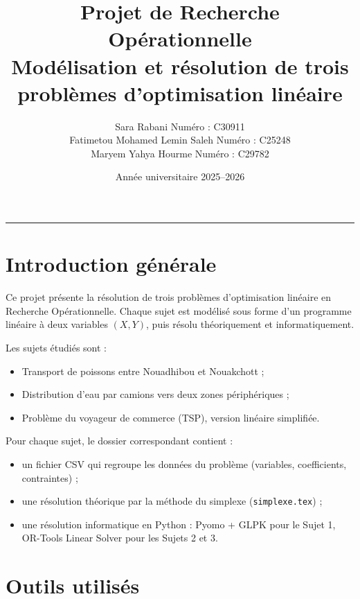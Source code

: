 \documentclass[12pt,a4paper]{article}
\title{\vspace{-1.2cm}\Huge\bfseries Projet de Recherche Opérationnelle\\[0.4em]
       \large\mdseries Modélisation et résolution de trois problèmes d'optimisation linéaire}
\author{%
  Sara Rabani \quad\textbar\quad Numéro : C30911 \\[2pt]
  Fatimetou Mohamed Lemin Saleh \quad\textbar\quad Numéro : C25248 \\[2pt]
  Maryem Yahya Hourme \quad\textbar\quad Numéro : C29782%
}
\date{Année universitaire 2025--2026}
\begin{document}

\maketitle
\thispagestyle{empty}
\vspace{0.5cm}
\hrule
\vspace{0.5cm}

\tableofcontents
\newpage

\section{Introduction générale}

Ce projet présente la résolution de trois problèmes d'optimisation linéaire en Recherche Opérationnelle. Chaque sujet est modélisé sous forme d'un programme linéaire à deux variables \((X, Y)\), puis résolu théoriquement et informatiquement.

Les sujets étudiés sont :
\begin{itemize}
    \item Transport de poissons entre Nouadhibou et Nouakchott ;
    \item Distribution d'eau par camions vers deux zones périphériques ;
    \item Problème du voyageur de commerce (TSP), version linéaire simplifiée.
\end{itemize}

Pour chaque sujet, le dossier correspondant contient :
\begin{itemize}
    \item un fichier CSV qui regroupe les données du problème (variables, coefficients, contraintes) ;
    \item une résolution théorique par la méthode du simplexe (\texttt{simplexe.tex}) ;
    \item une résolution informatique en Python : Pyomo + GLPK pour le Sujet 1, OR-Tools Linear Solver pour les Sujets 2 et 3.
\end{itemize}

\section{Outils utilisés}
\end{document}
